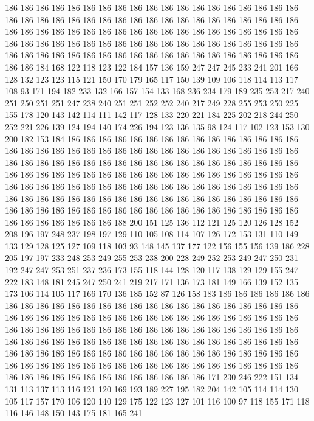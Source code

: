 186 186 186 186 186 186 186 186 186 186 186 186 186 186 186 186 186 186 186 186
186 186 186 186 186 186 186 186 186 186 186 186 186 186 186 186 186 186 186 186
186 186 186 186 186 186 186 186 186 186 186 186 186 186 186 186 186 186 186 186
186 186 186 186 186 186 186 186 186 186 186 186 186 186 186 186 186 186 186 186
186 186 186 186 186 186 186 186 186 186 186 186 186 186 186 186 186 184 168 122
118 123 122 184 157 136 159 247 247 245 233 241 201 166 128 132 123 123 115 121
150 170 179 165 117 150 139 109 106 118 114 113 117 108 93 171 194 182 233 132
166 157 154 133 168 236 234 179 189 235 253 217 240 251 250 251 251 247 238 240
251 251 252 252 240 217 249 228 255 253 250 225 155 178 120 143 142 114 111 142
117 128 133 220 221 184 225 202 218 244 250 252 221 226 139 124 194 140 174 226
194 123 136 135 98 124 117 102 123 153 130 200 182 153 184 186 186 186 186 186
186 186 186 186 186 186 186 186 186 186 186 186 186 186 186 186 186 186 186 186
186 186 186 186 186 186 186 186 186 186 186 186 186 186 186 186 186 186 186 186
186 186 186 186 186 186 186 186 186 186 186 186 186 186 186 186 186 186 186 186
186 186 186 186 186 186 186 186 186 186 186 186 186 186 186 186 186 186 186 186
186 186 186 186 186 186 186 186 186 186 186 186 186 186 186 186 186 186 186 186
186 186 186 186 186 186 186 186 186 186 186 186 186 186 186 186 186 186 186 186
186 186 186 186 186 186 186 186 186 186 186 188 200 151 125 136 112 121 125 120
126 128 152 208 196 197 248 237 198 197 129 110 105 108 114 107 126 172 153 131
110 149 133 129 128 125 127 109 118 103 93 148 145 137 177 122 156 155 156 139
186 228 205 197 197 233 248 253 249 255 253 238 200 228 249 252 253 249 247 250
231 192 247 247 253 251 237 236 173 155 118 144 128 120 117 138 129 129 155 247
222 183 148 181 245 247 250 241 219 217 171 136 173 181 149 166 139 152 135 173
106 114 105 117 166 170 136 185 152 87 126 158 183 186 186 186 186 186 186 186
186 186 186 186 186 186 186 186 186 186 186 186 186 186 186 186 186 186 186 186
186 186 186 186 186 186 186 186 186 186 186 186 186 186 186 186 186 186 186 186
186 186 186 186 186 186 186 186 186 186 186 186 186 186 186 186 186 186 186 186
186 186 186 186 186 186 186 186 186 186 186 186 186 186 186 186 186 186 186 186
186 186 186 186 186 186 186 186 186 186 186 186 186 186 186 186 186 186 186 186
186 186 186 186 186 186 186 186 186 186 186 186 186 186 186 186 186 186 186 186
186 186 186 186 186 186 171 230 246 222 151 134 131 113 137 113 116 121 120 169
193 189 227 195 182 204 142 105 114 114 130 105 117 157 170 106 120 140 129 175
122 123 127 101 116 100 97 118 155 171 118 116 146 148 150 143 175 181 165 241
